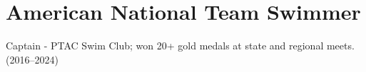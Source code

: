 \documentclass[letterpaper,10.8pt]{article} %
\begin{document}
\section{American National Team Swimmer}
 \begin{itemize}[leftmargin=0.15in, label={}, itemsep=1pt]
    \small{\item{
     Captain - PTAC Swim Club; won 20+ gold medals at state and regional meets. (2016–2024)
    }}
 \end{itemize}
\end{document}
